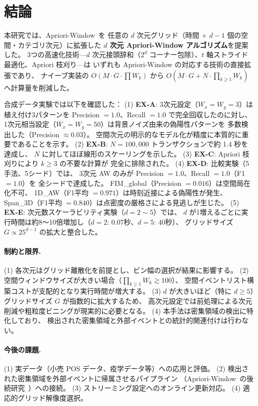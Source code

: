 \section{結論}\label{sec:conclusion}

本研究では、Apriori-Window~\cite{aprioriwindow}を
任意の $d$ 次元グリッド（時間 + $d{-}1$ 個の空間・カテゴリ次元）に拡張した
\textbf{$d$ 次元 Apriori-Window アルゴリズム}を提案した。
3つの高速化技術---$d$ 次元接頭辞和（$2^d$ コーナー包除）、$t$ 軸ストライド最適化、Apriori 枝刈り---は
いずれも Apriori-Window の対応する技術の直接拡張であり、
ナイーブ実装の $O(M \cdot G \cdot \prod W_k)$ から
$O(M \cdot G + N \cdot \prod_{k\geq1} W_k)$ へ計算量を削減した。

合成データ実験では以下を確認した：
(1) \textbf{EX-A}: 3次元設定（$W_x=W_y=3$）は植え付け3パターンを
Precision $= 1.0$、Recall $= 1.0$ で完全回収したのに対し、
1次元相当設定（$W_x=W_y=50$）は背景ノイズ由来の偽陽性パターンを
多数検出した（Precision $\approx 0.03$）。
空間次元の明示的なモデル化が精度に本質的に重要であることを示す。
(2) \textbf{EX-B}: $N = 100{,}000$ トランザクションで約 1.4 秒を達成し、
$N$ に対してほぼ線形のスケーリングを示した。
(3) \textbf{EX-C}: Apriori 枝刈りにより $k \geq 3$ の不要な計算が
完全に排除された。
(4) \textbf{EX-D}: 比較実験（5手法、5シード）では、
3次元 AW のみが Precision $= 1.0$、Recall $= 1.0$（F1 $= 1.0$）を
全シードで達成した。
FIM\_global（Precision $= 0.016$）は空間局在化不可、
1D\_AW（F1平均 $= 0.971$）は時刻近接による偽陽性が発生、
Span\_3D（F1平均 $= 0.840$）は点密度の厳格さによる見逃しが生じた。
(5) \textbf{EX-E}: 次元数スケーラビリティ実験（$d{=}2{\sim}5$）では、
$d$ が1増えるごとに実行時間は約8〜10倍増加し（$d{=}2$: 0.07秒、$d{=}5$: 40秒）、
グリッドサイズ $G \propto 25^{d-1}$ の拡大と整合した。

\paragraph{制約と限界.}
(1) 各次元はグリッド離散化を前提とし、ビン幅の選択が結果に影響する。
(2) 空間ウィンドウサイズが大きい場合（$\prod_{k\geq1} W_k \gtrsim 100$）、
空間イベントリスト構築コストが支配的となり実行時間が増大する。
(3) $d$ が大きいほど（特に $d \geq 5$）グリッドサイズ $G$ が指数的に拡大するため、
高次元設定では前処理による次元削減や粗粒度ビニングが現実的に必要となる。
(4) 本手法は密集領域の検出に特化しており、
検出された密集領域と外部イベントとの統計的関連付けは行わない。

\paragraph{今後の課題.}
(1) 実データ（小売 POS データ、疫学データ等）への応用と評価。
(2) 検出された密集領域を外部イベントに帰属させるパイプライン
（Apriori-Window~\cite{aprioriwindow}の後続研究~\cite{dsaa2025}）への接続。
(3) ストリーミング設定へのオンライン更新対応。
(4) 適応的グリッド解像度選択。
